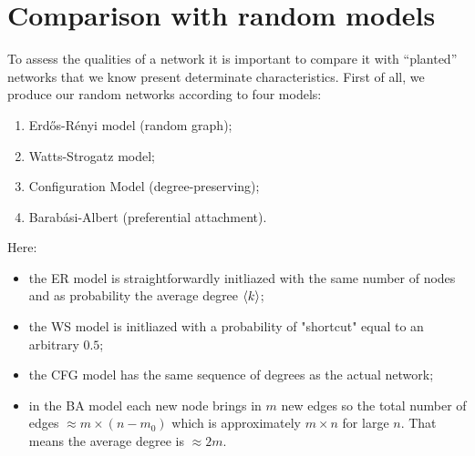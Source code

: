 \documentclass[12pt]{article}
\begin{document}
\section{Comparison with random models}
To assess the qualities of a network it is important to compare it with ``planted'' networks that we know present determinate characteristics. First of all, we produce our random networks according to four models:
\begin{enumerate}
	\item Erdős-Rényi model (random graph);
	\item Watts-Strogatz model;
	\item Configuration Model (degree-preserving);
	\item Barabási-Albert (preferential attachment).
\end{enumerate}
Here:
\begin{itemize}
	\item the ER model is straightforwardly initliazed with the same number of nodes and as probability the average degree $\langle k\rangle$;
	\item the WS model is initliazed with a probability of "shortcut" equal to an arbitrary $0.5$;
	\item the CFG model has the same sequence of degrees as the actual network;
	\item in the BA model each new node brings in $m$ new edges so the total number of edges $\approx m \times (n - m_{0})$ which is approximately $m\times n$ for large $n$. That means the average degree is $\approx 2m$.
\end{itemize}
\end{document}
